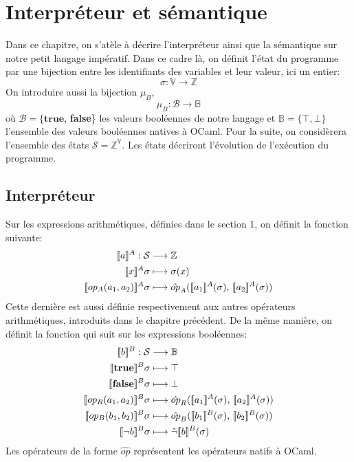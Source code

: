 \documentclass[a4paper, 12pt]{article}
\begin{document}
\section{Interpréteur et sémantique}
Dans ce chapitre, on s'atèle à décrire l'interpréteur ainsi que la sémantique sur notre petit langage impératif. 
Dans ce cadre là, on définit l'état du programme par une bijection entre les identifiants des variables et leur valeur, 
ici un entier:
\[\sigma : \mathbb{V} \longrightarrow \mathbb{Z}\]
On introduire aussi la bijection $\mu_B$,
\[\mu_B : \mathcal{B} \longrightarrow \mathbb{B}\]
où $\mathcal{B} = \{\textbf{true}$, \textbf{false}\} les valeurs booléennes de notre langage et $\mathbb{B} = \{\top, \bot\}$ 
l'ensemble des valeurs booléennes natives à OCaml. Pour la suite, on considèrera l'ensemble des états $\mathcal{S} = \mathbb{Z}^\mathbb{V}$.
Les états décriront l'évolution de l'exécution du programme.

\subsection{Interpréteur}
Sur les expressions arithmétiques, définies dans le section 1, on définit la fonction suivante:
\begin{align*}
	\intrfun{a}{A}:\mathcal{S}&\longrightarrow\mathbb{Z}\\
	\intrfun{x}{A}\sigma&\longmapsto\sigma(x)\\
	\intrfun{op_A(a_1, a_2)}{A}\sigma&\longmapsto\hat{op}_A(\intr{a_1}{A}{\sigma}\text{, }\intr{a_2}{A}{\sigma})\\
\end{align*}
Cette dernière est aussi définie respectivement aux autres opérateurs arithmétiques, introduits dans le chapitre précédent.
De la même manière, on définit la fonction qui suit sur les expressions booléennes:
\begin{align*}
	\intrfun{b}{B}:\mathcal{S}&\longrightarrow\mathbb{B}\\	
	\intrfun{\textbf{true}}{B}\sigma&\longmapsto\top\\
	\intrfun{\textbf{false}}{B}\sigma&\longmapsto\bot\\
	\intrfun{op_R(a_1, a_2)}{B}\sigma &\longmapsto \hat{op}_R(\intr{a_1}{A}{\sigma}\text{, }\intr{a_2}{A}{\sigma})\\
	\intrfun{op_B(b_1, b_2)}{B}\sigma&\longmapsto \hat{op}_B(\intr{b_1}{B}{\sigma}\text{, }\intr{b_2}{B}{\sigma})\\
	\intrfun{\neg b}{B}\sigma&\longmapsto\hat{\neg}\intr{b}{B}{\sigma}
\end{align*}
Les opérateurs de la forme $\hat{op}$ représentent les opérateurs natifs à OCaml.
\end{document}
